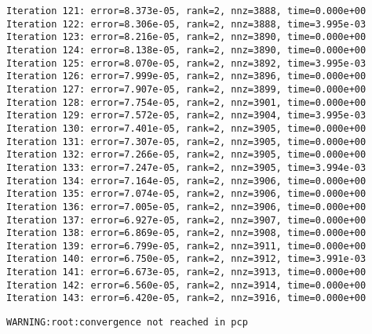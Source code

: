 \documentclass[11pt]{article}
\begin{document}
\begin{Verbatim}[commandchars=\\\{\}]
Iteration 121: error=8.373e-05, rank=2, nnz=3888, time=0.000e+00
Iteration 122: error=8.306e-05, rank=2, nnz=3888, time=3.995e-03
Iteration 123: error=8.216e-05, rank=2, nnz=3890, time=0.000e+00
Iteration 124: error=8.138e-05, rank=2, nnz=3890, time=0.000e+00
Iteration 125: error=8.070e-05, rank=2, nnz=3892, time=3.995e-03
Iteration 126: error=7.999e-05, rank=2, nnz=3896, time=0.000e+00
Iteration 127: error=7.907e-05, rank=2, nnz=3899, time=0.000e+00
Iteration 128: error=7.754e-05, rank=2, nnz=3901, time=0.000e+00
Iteration 129: error=7.572e-05, rank=2, nnz=3904, time=3.995e-03
Iteration 130: error=7.401e-05, rank=2, nnz=3905, time=0.000e+00
Iteration 131: error=7.307e-05, rank=2, nnz=3905, time=0.000e+00
Iteration 132: error=7.266e-05, rank=2, nnz=3905, time=0.000e+00
Iteration 133: error=7.247e-05, rank=2, nnz=3905, time=3.994e-03
Iteration 134: error=7.164e-05, rank=2, nnz=3906, time=0.000e+00
Iteration 135: error=7.074e-05, rank=2, nnz=3906, time=0.000e+00
Iteration 136: error=7.005e-05, rank=2, nnz=3906, time=0.000e+00
Iteration 137: error=6.927e-05, rank=2, nnz=3907, time=0.000e+00
Iteration 138: error=6.869e-05, rank=2, nnz=3908, time=0.000e+00
Iteration 139: error=6.799e-05, rank=2, nnz=3911, time=0.000e+00
Iteration 140: error=6.750e-05, rank=2, nnz=3912, time=3.991e-03
Iteration 141: error=6.673e-05, rank=2, nnz=3913, time=0.000e+00
Iteration 142: error=6.560e-05, rank=2, nnz=3914, time=0.000e+00
Iteration 143: error=6.420e-05, rank=2, nnz=3916, time=0.000e+00

    \end{Verbatim}

    \begin{Verbatim}[commandchars=\\\{\}]
WARNING:root:convergence not reached in pcp

    \end{Verbatim}
\end{document}
